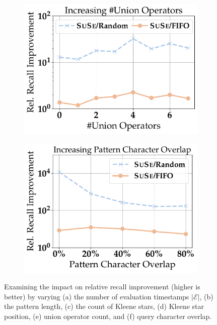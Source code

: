 \begin{figure}[t]
	\vspace{1em} 
	\begin{subfigure}{.38\linewidth}
		\centering
		\includegraphics[width=\linewidth]{revision_plots/number_of_disjunction_operators_combined_plot.pdf}
		\vspace{-18pt}
		\caption{}
		\label{plot:number_of_unions}
	\end{subfigure}
	\hfill
	\begin{subfigure}{.38\linewidth}
		\centering
		\includegraphics[width=\linewidth]{revision_plots/disjunction_operator_overlapping_percentage.pdf}
		\vspace{-18pt}
		\caption{}
		\label{plot:query_character_overlap}
	\end{subfigure}

	\vspace{-1em}
	\caption{Examining the impact on relative recall improvement (higher is better) by varying (a) the number of evaluation timestamps $|\mathcal{E}|$, (b) the pattern length, (c) the count of Kleene stars, (d) Kleene star position, (e) union operator count, and (f) query character overlap.}
	\label{fig:operator_analysis}
	\vspace{-1em}
\end{figure}


